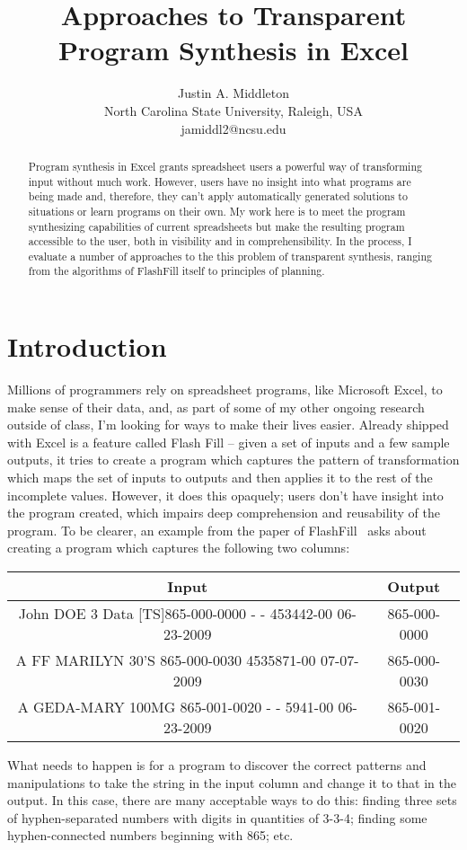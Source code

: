 \documentclass[11pt]{article}
\title{Approaches to Transparent Program Synthesis in Excel}
\author{Justin A. Middleton\\North Carolina State University, Raleigh, USA\\jamiddl2@ncsu.edu}
\begin{document}
\maketitle

\begin{abstract}
Program synthesis in Excel grants spreadsheet users a powerful way of transforming
input without much work. However, users have no insight into what programs are being
made and, therefore, they can't apply automatically generated solutions to situations
or learn programs on their own. My work here is to meet the program synthesizing
capabilities of current spreadsheets but make the resulting program accessible to
the user, both in visibility and in comprehensibility. In the process, I evaluate
a number of approaches to the this problem of transparent synthesis, ranging from
the algorithms of FlashFill itself to principles of planning.
\end{abstract}

\section{Introduction}
Millions of programmers rely on spreadsheet programs, like Microsoft Excel, to make sense of their data, and, as part of some of my other ongoing research outside of class, I’m looking for ways to make their lives easier. Already shipped with Excel is a feature called Flash Fill – given a set of inputs and a few sample outputs, it tries to create a program which captures the pattern of transformation which maps the set of inputs to outputs and then applies it to the rest of the incomplete values. However, it does this opaquely; users don’t have insight into the program created, which impairs deep comprehension and reusability of the program.
To be clearer, an example from the paper of FlashFill~\cite{gulwani2011automating} asks about creating a program which captures the following two columns:

\begin{center}
	\begin{tabular}{|c|c|}
		\hline
		Input & Output \\
		\hline\hline
		John DOE 3 Data [TS]865-000-0000 - - 453442-00 06-23-2009 & 865-000-0000 \\
		\hline
		A FF MARILYN 30’S 865-000-0030 4535871-00 07-07-2009 & 865-000-0030 \\
		\hline 
		A GEDA-MARY 100MG 865-001-0020 - - 5941-00 06-23-2009 & 865-001-0020 \\
		\hline
	\end{tabular}
\end{center}

What needs to happen is for a program to discover the correct patterns and manipulations to take the string in the input column and change it to that in the output. In this case, there are many acceptable ways to do this: finding three sets of hyphen-separated numbers with digits in quantities of 3-3-4; finding some hyphen-connected numbers beginning with 865; etc.


{}

\end{document}
